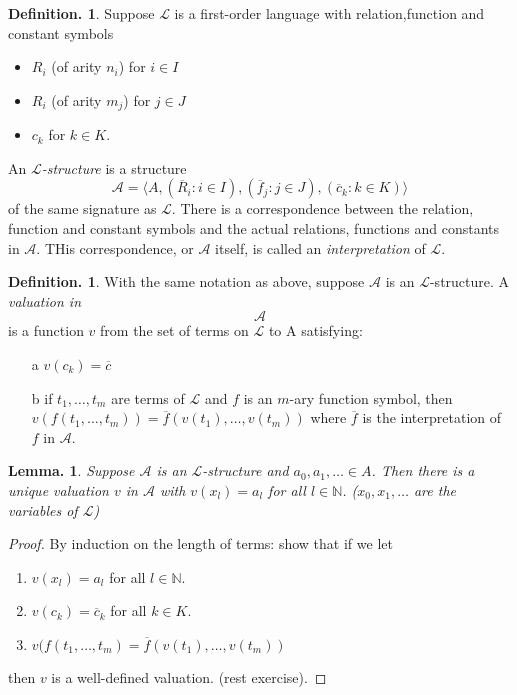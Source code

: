 \documentclass[a4paper,oneside,11pt,DIV=12,parskip=half]{scrartcl}
\newcommand{\N}{\mathbb N}
\newcommand{\LL}{\mathcal L}
\theoremstyle{plain}
\newtheorem{lemma}[theorem]{Lemma.}
\theoremstyle{definition}
\newtheorem{definition}[theorem]{Definition.}
\newtheorem{remark, definition}[theorem]{Remark and Definition.}
\newtheorem{lemma, definition}[theorem]{Lemma and Definition.}
\newtheorem{theorem, definition}[theorem]{Theorem and Definition.}
\theoremstyle{remark}
\newtheorem*{remark, example}{\textbf{Remark and Exercise}}
\begin{document}
\begin{definition}
Suppose $\LL$ is a first-order language with relation,function and constant symbols
\begin{itemize}
    \item $R_i$ (of arity $n_i$) for $i \in I$
    \item $R_i$ (of arity $m_j$) for $j \in J$
    \item $c_k$ for $k \in K$.
\end{itemize}
An \emph{$\LL$-structure} is a structure 
\[ \mathcal{A} = \big \langle A, (\overline{R}_i : i\in I), (\overline{f}_j : j\in J), (\overline{c}_k : k\in K) \big \rangle \] of the same signature as $\LL$.
There is a correspondence between the relation, function and constant symbols and the actual relations, functions and constants in $\mathcal{A}$. THis correspondence, or $\mathcal{A}$ itself, is called an \emph{interpretation} of $\LL$.
\end{definition}

\begin{definition}
With the same notation as above, suppose $\mathcal{A}$ is an $\LL$-structure. A \emph{valuation in $$\mathcal{A}$$} is a function $v$ from the set of terms on $\LL$ to A satisfying:
\begin{itemize}
    \item[a] $v(c_k) = \overline{c}$
    \item[b] if $t_1,\dots, t_m$ are terms of $\LL$ and $f$ is an $m$-ary function symbol, then $v(f(t_1,\dots,t_m)) = \overline{f}(v(t_1),\dots,v(t_m))$ where $\overline{f}$ is the interpretation of $f$ in $\mathcal{A}$.
\end{itemize}
\end{definition}

\begin{lemma}
Suppose $\mathcal{A}$ is an $\LL$-structure and $a_0,a_1,\dots \in A$. Then there is a unique valuation $v$ in $\mathcal{A}$ with $v(x_l) =a_l$ for all $l \in \N$.
($x_0,x_1,\dots$ are the variables of $\LL$)
\end{lemma}

\begin{proof}
By induction on the length of terms: show that if we let
\begin{enumerate}
    \item $v(x_l) = a_l$ for all $l \in \N$.
    \item $v(c_k) = \overline{c}_k$ for all $k \in K$.
    \item $v(f(t_1,\dots,t_m) = \overline{f}(v(t_1),\dots,v(t_m))$
\end{enumerate}
then $v$ is a well-defined valuation. (rest exercise).
\end{proof}
\end{document}
